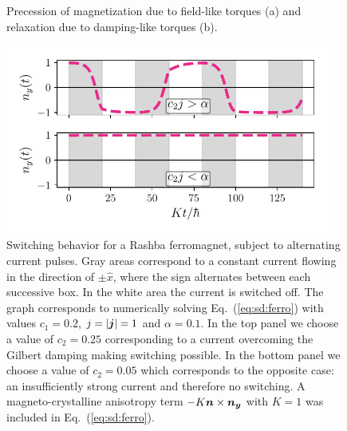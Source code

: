 \begin{figure}
    \centering
    \hspace{0.2\textwidth}
    \caption{Precession of magnetization due to field-like torques (a) and relaxation due to damping-like torques (b). }
    \label{fig:llg}
\end{figure}

\begin{figure}
    \centering
    \includegraphics[width=0.95\textwidth]{gfx/switch_ferro}
    \caption{Switching behavior for a Rashba ferromagnet, subject to alternating current pulses. Gray areas correspond to a constant current flowing in the direction of $\pm\hat{x}$, where the sign alternates between each successive box. In the white area the current is switched off. The graph corresponds to numerically solving Eq.~(\ref{eq:sd:ferro}) with values $c_1=0.2$, $j=|\boldsymbol{j}|=1$ and $\alpha=0.1$. In the top panel we choose a value of $c_2=0.25$ corresponding to a current overcoming the Gilbert damping making switching possible. In the bottom panel we choose a value of $c_2=0.05$ which corresponds to the opposite case: an insufficiently strong current and therefore no switching. A magneto-crystalline anisotropy term $-K \boldsymbol{n}\times\boldsymbol{n_y}$ with $K=1$ was included in Eq.~(\ref{eq:sd:ferro}).} 
    \label{fig:switching_ferro}
\end{figure}
